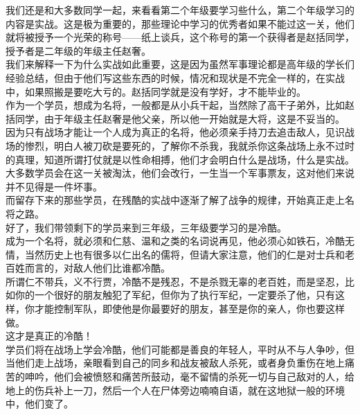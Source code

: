 \begin{multicols}{\theparacolNo}
我们还是和大多数同学一起，来看看第二个年级要学习些什么，第二个年级学习的内容是实战。这是极为重要的，那些理论中学习的优秀者如果不能过这一关，他们就将被授予一个光荣的称号——纸上谈兵，这个称号的第一个获得者是赵括同学，授予者是二年级的年级主任赵奢。\\

我们来解释一下为什么实战如此重要，这是因为虽然军事理论都是高年级的学长们经验总结，但由于他们写这些东西的时候，情况和现状是不完全一样的，在实战中，如果照搬是要吃大亏的。赵括同学就是没有学好，才不能毕业的。\\

作为一个学员，想成为名将，一般都是从小兵干起，当然除了高干子弟外，比如赵括同学，由于年级主任赵奢是他父亲，所以他一开始就是大将，这是不妥当的。\\

因为只有战场才能让一个人成为真正的名将，他必须亲手持刀去追击敌人，见识战场的惨烈，明白人被刀砍是要死的，了解你不杀我，我就杀你这条战场上永不过时的真理，知道所谓打仗就是以性命相搏，他们才会明白什么是战场，什么是实战。\\

大多数学员会在这一关被淘汰，他们会改行，一生当一个军事票友，这对他们来说并不见得是一件坏事。\\

而留存下来的那些学员，在残酷的实战中逐渐了解了战争的规律，开始真正走上名将之路。\\

好了，我们带领剩下的学员来到三年级，三年级要学习的是冷酷。\\

成为一个名将，就必须和仁慈、温和之类的名词说再见，他必须心如铁石，冷酷无情，当然历史上也有很多以仁出名的儒将，但请大家注意，他们的仁是对士兵和老百姓而言的，对敌人他们比谁都冷酷。\\

所谓仁不带兵，义不行贾，冷酷不是残忍，不是杀戮无辜的老百姓，而是坚忍，比如你的一个很好的朋友触犯了军纪，但你为了执行军纪，一定要杀了他，只有这样，你才能控制军队，即使他是你最要好的朋友，甚至是你的亲人，你也要这样做。\\

这才是真正的冷酷！\\

学员们将在战场上学会冷酷，他们可能都是善良的年轻人，平时从不与人争吵，但当他们走上战场，亲眼看到自己的同乡和战友被敌人杀死，或者身负重伤在地上痛苦的呻吟，他们会被愤怒和痛苦所鼓动，毫不留情的杀死一切与自己敌对的人，给地上的伤兵补上一刀，然后一个人在尸体旁边喃喃自语，就在这地狱一般的环境中，他们变了。\\


\end{multicols}
